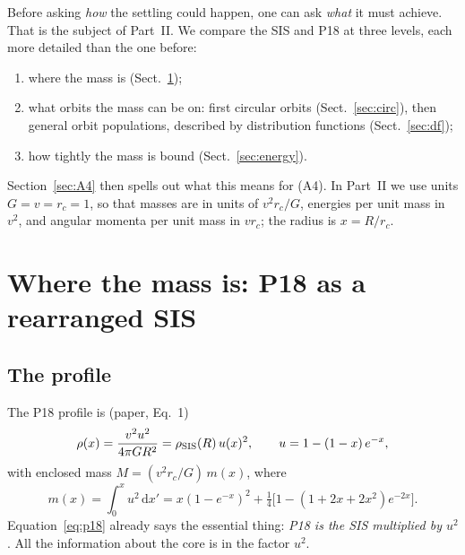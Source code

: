 \documentclass[11pt,a4paper]{article}
\newcommand{\rc}{r_c}
\newcommand{\dd}{\mathrm{d}}
\begin{document}
Before asking \emph{how} the settling could happen, one can ask \emph{what} it must
achieve. That is the subject of Part~II. We compare the SIS and P18 at three
levels, each more detailed than the one before:
\begin{enumerate}
\item where the mass is (Sect.~\ref{sec:mass});
\item what orbits the mass can be on: first circular orbits
  (Sect.~\ref{sec:circ}), then general orbit populations, described by distribution
  functions (Sect.~\ref{sec:df});
\item how tightly the mass is bound (Sect.~\ref{sec:energy}).
\end{enumerate}
Section~\ref{sec:A4} then spells out what this means for (A4). In Part~II we use
units $G=v=\rc=1$, so that masses are in units of $v^2\rc/G$, energies per unit
mass in $v^2$, and angular momenta per unit mass in $v\rc$; the radius is
$x=R/\rc$.

\section{Where the mass is: P18 as a rearranged SIS}\label{sec:mass}

\subsection{The profile}
The P18 profile is (paper, Eq.~1)
\begin{equation}
  \rho(x)=\frac{v^2u^2}{4\pi GR^2}=\rho_{\rm SIS}(R)\,u(x)^2,
  \qquad u=1-(1-x)\,e^{-x},
  \label{eq:p18}
\end{equation}
with enclosed mass $M=(v^2\rc/G)\,m(x)$, where
\begin{equation}
  m(x)=\int_0^xu^2\,\dd x'=x(1-e^{-x})^2+\tfrac14\bigl[1-(1+2x+2x^2)e^{-2x}\bigr].
  \label{eq:m}
\end{equation}
Equation~\eqref{eq:p18} already says the essential thing: \emph{P18 is the SIS
multiplied by $u^2$}. All the information about the core is in the factor $u^2$.
\end{document}
